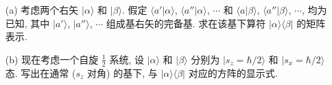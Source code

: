 \documentclass{assignment}
\begin{document}
\begin{prob}[课本习题 1.6]
    \begin{itemize}
        \item[(a)] 考虑两个右矢 $\lvert\alpha\rangle$ 和 $\lvert\beta\rangle$. 假定 $\langle a'\vert\alpha\rangle$, $\langle a''\vert\alpha\rangle$, $\cdots$ 和 $\langle a\vert\beta\rangle$, $\langle a''\vert\beta\rangle$, $\cdots$, 均为已知, 其中 $\lvert a'\rangle$, $\lvert a''\rangle$, $\cdots$ 组成基右矢的完备基. 求在该基下算符 $\lvert\alpha\rangle\langle\beta\rvert$ 的矩阵表示.
        \item[(b)] 现在考虑一个自旋 $\frac{1}{2}$ 系统, 设 $\lvert\alpha\rangle$ 和 $\lvert\beta\rangle$ 分别为 $\lvert s_z=\hbar/2\rangle$ 和 $\lvert s_x=\hbar/2\rangle$ 态. 写出在通常 ($s_z$ 对角) 的基下, 与 $\lvert\alpha\rangle\langle\beta\rvert$ 对应的方阵的显示式.
    \end{itemize}
\end{prob}
\end{document}
